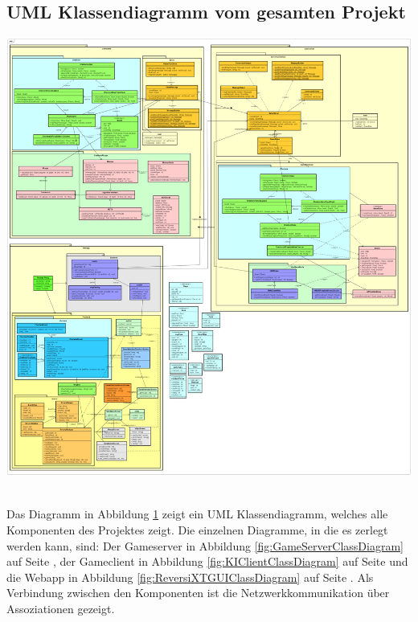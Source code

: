 \documentclass[12pt,a4paper,bibliography=totocnumbered,listof=totocnumbered]{article}
\begin{document}
\begin{appendix}
\section{\ac{UML} Klassendiagramm vom gesamten Projekt}
\label{apx:AllClassDiagrams}
\vspace{1em}
\begin{minipage}{\linewidth}
	\centering
	\includegraphics[width=1.0\linewidth]{pics/AllClassDiagrams.png}
\end{minipage}
\\

Das Diagramm in Abbildung \ref{apx:AllClassDiagrams} zeigt ein \ac{UML} Klassendiagramm, welches alle Komponenten des Projektes zeigt.
Die einzelnen Diagramme, in die es zerlegt werden kann, sind: Der Gameserver in Abbildung \ref{fig:GameServerClassDiagram} auf Seite \pageref{fig:GameServerClassDiagram},
der Gameclient in Abbildung \ref{fig:KIClientClassDiagram} auf Seite \pageref{fig:KIClientClassDiagram} und die Webapp in Abbildung \ref{fig:ReversiXTGUIClassDiagram}
auf Seite \pageref{fig:ReversiXTGUIClassDiagram}. Als Verbindung zwischen den Komponenten ist die Netzwerkkommunikation über Assoziationen gezeigt. 


\end{appendix}
\end{document}
